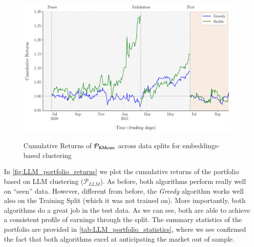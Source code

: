 \begin{figure}[H]
  \centering
    \caption{Cumulative Returns of $\mathcal{P}_{\text{KMeans}}$ across data splits for embeddings-based clustering}
  \includegraphics[scale=0.58]{KMeans_Portfolio_Cum_Returns_(L=4,theta=0.5k).pdf}
  \label{fig:KMeans_Portfolio_Cum_Returns}
\end{figure}



\mx 
In \cref{fig:LLM_portfolio_returns} we plot the cumulative returns of the portfolio based on LLM clustering ($\mathcal P_{LLM}$). As before, both algorithms perform really well on ``seen'' data. However, different from before, the \textit{Greedy} algorithm works well also on the Training Split (which it was not trained on). More importantly, both algorithms do a great job in the test data. As we can see, both are able to achieve a consistent profile of earnings through the split. 
%
The summary statistics of the portfolio are provided in \cref{tab:LLM_portfolio_statistics}, where we see confirmed the fact that both algorithms excel at anticipating the market out of sample. 

